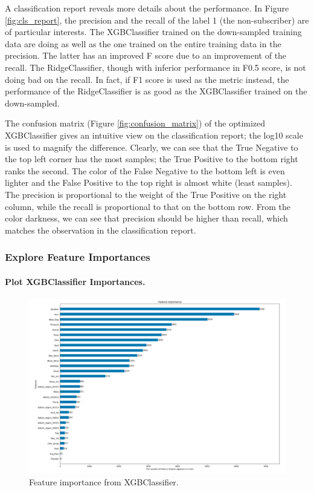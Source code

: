 \documentclass[a4paper]{article}
\begin{document}
			A classification report reveals more details about the performance. In Figure \ref{fig:cls_report}, the precision and the recall of the label 1 (the non-subscriber) are of particular interests. The XGBClassifier trained on the down-sampled training data are doing as well as the one trained on the entire training data in the precision. The latter has an improved F score due to an improvement of the recall. The RidgeClassifier, though with inferior performance in F0.5 score, is not doing bad on the recall. In fact, if F1 score is used as the metric instead, the performance of the RidgeClassifier is as good as the XGBClassifier trained on the down-sampled.
			
			The confusion matrix (Figure \ref{fig:confusion_matrix}) of the optimized XGBClassifier gives an intuitive view on the classification report; the log10 scale is used to magnify the difference. Clearly, we can see that the True Negative to the top left corner has the most samples; the True Positive to the bottom right ranks the second. The color of the False Negative to the bottom left is even lighter and the False Positive to the top right is almost white (least samples). The precision is proportional to the weight of the True Positive on the right column, while the recall is proportional to that on the bottom row. From the color darkness, we can see that precision should be higher than recall, which matches the observation in the classification report.
			
			\subsubsection{Explore Feature Importances}
			\paragraph{Plot XGBClassifier Importances.}
			
			\begin{figure}
				\centering
				\includegraphics[width=1\textwidth]{xgb_Importance.png}
				\caption{\label{fig:xgb_importance}Feature importance from XGBClassifier.}	
			\end{figure}	
			
\end{document}
